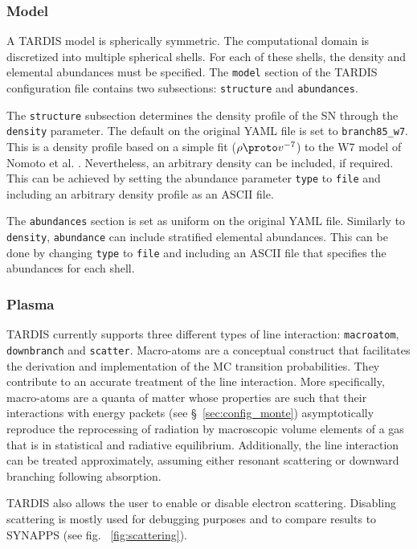 \documentclass[letterpaper,12pt]{article}
\begin{document}
\subsubsection{\label{sec:config_model} Model}

A TARDIS model is spherically symmetric. The computational domain is discretized into multiple spherical shells. For each of these shells, the density and elemental abundances must be specified. The \texttt{model} section of the TARDIS configuration file contains two subsections: \texttt{structure} and \texttt{abundances}. 

The \texttt{structure} subsection determines the density profile of the SN through the \texttt{density} parameter. The default on the original YAML file is set to \texttt{branch85\_w7}. This is a density profile based on a simple fit ($\rho \proto v^{-7}$) to the W7 model of Nomoto et al. \cite{w7}. Nevertheless, an arbitrary density can be included, if required. This can be achieved by setting the abundance parameter \texttt{type} to \texttt{file} and including an arbitrary density profile as an ASCII file. 

The \texttt{abundances} section is set as uniform on the original YAML file. Similarly to \texttt{density}, \texttt{abundance} can include stratified elemental abundances. This can be done by changing \texttt{type} to \texttt{file} and including an ASCII file that specifies the abundances for each shell.  

\subsubsection{\label{sec:config_plasma} Plasma}

TARDIS currently supports three different types of line interaction: \texttt{macroatom}, \texttt{downbranch} and \texttt{scatter}. Macro-atoms \cite{lucy_2002} are a conceptual construct that facilitates the derivation and implementation of the MC transition probabilities. They contribute to an accurate treatment of the line interaction. More specifically, macro-atoms are a quanta of matter whose properties are such that their interactions with energy packets (see \S ~\ref{sec:config_monte}) asymptotically reproduce the reprocessing of radiation by macroscopic volume elements of a gas that is in statistical and radiative equilibrium. Additionally, the line interaction can be treated approximately, assuming either resonant scattering or downward branching following absorption. 

TARDIS also allows the user to enable or disable electron scattering. Disabling scattering is mostly used for debugging purposes and to compare results to SYNAPPS (see fig. ~\ref{fig:scattering}). 
\end{document}
